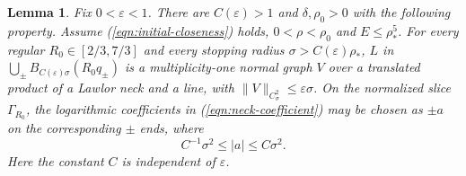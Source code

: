 \documentclass[11pt,a4paper]{article}
\numberwithin{equation}{section}
\newtheorem{lemma}[theorem]{Lemma}
\theoremstyle{definition}
\theoremstyle{remark}
\begin{document}
	\begin{lemma}\label{lem:common-slice}
		Fix $0<\varepsilon<1$. There are $C(\varepsilon)>1$ and $\delta,\rho_0>0$
		with the following property. Assume (\ref{eqn:initial-closeness}) holds,
		$0<\rho<\rho_0$ and $E\le\rho_*^5$.
		For every regular $R_0\in[2/3,7/3]$ and every stopping radius
		$\sigma>C(\varepsilon)\rho_*$,
		$L$ in $\bigcup_\pm B_{C(\varepsilon)\sigma}(R_0q_\pm)$ is a multiplicity-one
		normal graph $V$ over a translated product of a Lawlor neck and a line, with
		$\|V\|_{C^2_\sigma}\le\varepsilon\sigma$.
		On the normalized slice $\Gamma_{R_0}$, the logarithmic coefficients
		in (\ref{eqn:neck-coefficient}) may be chosen as $\pm a$ on the
		corresponding $\pm$ ends, where
		\[
		C^{-1}\sigma^2\le |a|\le C\sigma^2.
		\]
		Here the constant $C$ is independent of $\varepsilon$.
	\end{lemma}
	
\end{document}
